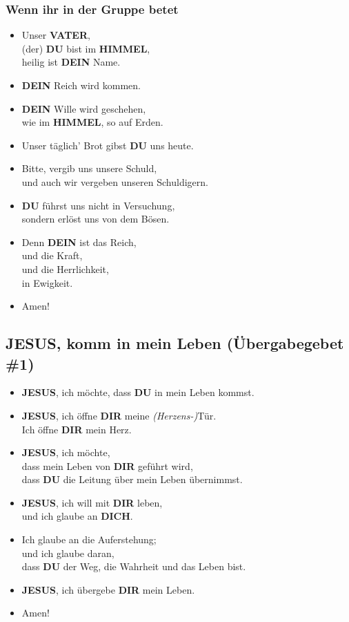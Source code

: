 \documentclass[10pt,a5paper]{article}
\newcommand{\Dein}[0]{\textbf{DEIN}}
\newcommand{\Dich}[0]{\textbf{DICH}}
\newcommand{\Dir}[0]{\textbf{DIR}}
\newcommand{\Du}[0]{\textbf{DU}}
\newcommand{\Himmel}[0]{\textbf{HIMMEL}}
\newcommand{\Jesus}[0]{\textbf{JESUS}}
\newcommand{\Vater}[0]{\textbf{VATER}}
\begin{document}
	\subsubsection{Wenn ihr in der Gruppe betet}
		\begin{itemize}[nosep]
			\item	Unser {\Vater},
					\\
					(der) {\Du} bist im {\Himmel},
					\\
					heilig ist {\Dein} Name.
			\item	{\Dein} Reich wird kommen.
			\item	{\Dein} Wille wird geschehen,
					\\
					wie im {\Himmel},
					so auf Erden.
			\item	Unser t\"aglich' Brot gibst {\Du} uns heute.
			\item	Bitte,
					vergib uns unsere Schuld,
					\\
					und auch wir vergeben unseren Schuldigern.
			\item	{\Du} f\"uhrst uns nicht in Versuchung,
					\\
					sondern erl\"ost uns von dem B\"osen.
			\item	Denn {\Dein} ist das Reich,
					\\
					und die Kraft,
					\\
					und die Herrlichkeit,
					\\
					in Ewigkeit.
			\item	Amen!
		\end{itemize}

	\subsection{{\Jesus}, komm in mein Leben (\"Ubergabegebet \#1)}
		\begin{itemize}[nosep]
			\item	{\Jesus},
					ich m\"ochte,
					dass {\Du} in mein Leben kommst.
			\item	{\Jesus},
					ich \"offne {\Dir} meine \textit{(Herzens-)}T\"ur.
					\\
					Ich \"offne {\Dir} mein Herz.
			\item	{\Jesus},
					ich m\"ochte,
					\\
					dass mein Leben von {\Dir} gef\"uhrt wird,
					\\
					dass {\Du} die Leitung \"uber mein Leben \"ubernimmst.
			\item	{\Jesus},
					ich will mit {\Dir} leben,
					\\
					und ich glaube an {\Dich}.
			\item	Ich glaube an die Auferstehung;
					\\
					und ich glaube daran,
					\\
					dass {\Du} der Weg,
					die Wahrheit und das Leben bist.
			\item	{\Jesus},
					ich \"ubergebe {\Dir} mein Leben.
			\item	Amen!
		\end{itemize}
\end{document}
